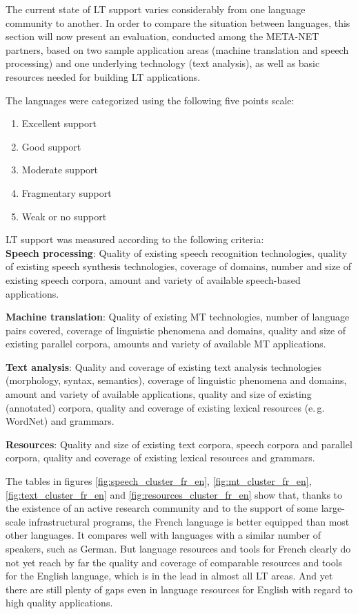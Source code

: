 \begin{multicols}{2}
The current state of LT support varies considerably from one language
community to another. In order to compare the situation between
languages, this section will now present an evaluation, conducted
among the META-NET partners, based on two sample application areas
(machine translation and speech processing) and one underlying
technology (text analysis), as well as basic resources needed for
building LT applications.

The languages were categorized using the following five points scale:
\begin{enumerate}
\item Excellent support
\item Good support
\item Moderate support
\item Fragmentary support
\item Weak or no support
\end{enumerate}

LT support was measured according to the following criteria:\\

{\bf Speech processing}: Quality of existing speech recognition
technologies, quality of existing speech synthesis technologies,
coverage of domains, number and size of existing speech corpora,
amount and variety of available speech-based applications.

{\bf Machine translation}: Quality of existing MT technologies, number
of language pairs covered, coverage of linguistic phenomena and
domains, quality and size of existing parallel corpora, amounts and
variety of available MT applications.

{\bf Text analysis}: Quality and coverage of existing text analysis
technologies (morphology, syntax, semantics), coverage of linguistic
phenomena and domains, amount and variety of available applications,
quality and size of existing (annotated) corpora, quality and coverage
of existing lexical resources (e.\,g. WordNet) and grammars.

{\bf Resources}: Quality and size of existing text corpora, speech
corpora and parallel corpora, quality and coverage of existing lexical
resources and grammars.



The tables in figures \ref{fig:speech_cluster_fr_en},
\ref{fig:mt_cluster_fr_en}, \ref{fig:text_cluster_fr_en} and
\ref{fig:resources_cluster_fr_en} show that, thanks to the existence
of an active research community and to the support of some large-scale
infrastructural programs, the French language is better equipped than
most other languages. It compares well with languages with a similar
number of speakers, such as German. But language resources and tools
for French clearly do not yet reach by far the quality and coverage of
comparable resources and tools for the English language, which is in
the lead in almost all LT areas. And yet there are still plenty of
gaps even in language resources for English with regard to high
quality applications.


\end{multicols}
